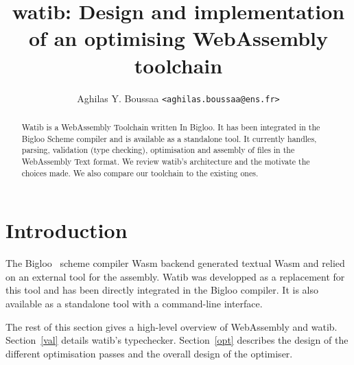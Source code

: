 \documentclass[10pt]{article}
\author{Aghilas Y. Boussaa \texttt{<aghilas.boussaa@ens.fr>}}
\title{\textsf{watib}: Design and implementation of an optimising WebAssembly
  toolchain}
\begin{document}
\maketitle
\begin{abstract}
  Watib is a WebAssembly Toolchain written In Bigloo. It has been integrated in
  the Bigloo Scheme compiler and is available as a standalone tool. It currently
  handles, parsing, validation (type checking), optimisation and assembly of
  files in the WebAssembly Text format. We review watib's architecture and the
  motivate the choices made. We also compare our toolchain to the existing ones.
\end{abstract}

\section{Introduction}
The Bigloo~\cite{Bigloo} scheme compiler Wasm backend generated textual Wasm and
relied on an external tool for the assembly. Watib was developped as a
replacement for this tool and has been directly integrated in the Bigloo
compiler. It is also available as a standalone tool with a command-line
interface.

The rest of this section gives a high-level overview of WebAssembly and watib.
Section~\ref{val} details watib's typechecker. Section~\ref{opt} describes the
design of the different optimisation passes and the overall design of the
optimiser.
\end{document}
